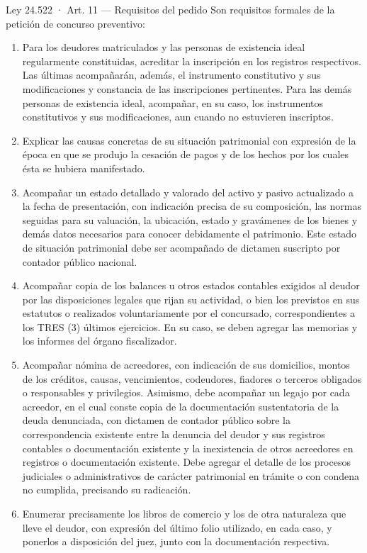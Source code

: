 \documentclass[12pt,oneside]{book}
\begin{document}
\begin{norma}{Ley 24.522 · Art. 11 — Requisitos del pedido}
Son requisitos formales de la petición de concurso preventivo:
\begin{enumerate}[label=\arabic*),leftmargin=*]
    \item Para los deudores matriculados y las personas de existencia ideal regularmente constituidas, acreditar la inscripción en los registros respectivos. Las últimas acompañarán, además, el instrumento constitutivo y sus modificaciones y constancia de las inscripciones pertinentes. Para las demás personas de existencia ideal, acompañar, en su caso, los instrumentos constitutivos y sus modificaciones, aun cuando no estuvieren inscriptos.
    \item Explicar las causas concretas de su situación patrimonial con expresión de la época en que se produjo la cesación de pagos y de los hechos por los cuales ésta se hubiera manifestado.
    \item Acompañar un estado detallado y valorado del activo y pasivo actualizado a la fecha de presentación, con indicación precisa de su composición, las normas seguidas para su valuación, la ubicación, estado y gravámenes de los bienes y demás datos necesarios para conocer debidamente el patrimonio. Este estado de situación patrimonial debe ser acompañado de dictamen suscripto por contador público nacional.
    \item Acompañar copia de los balances u otros estados contables exigidos al deudor por las disposiciones legales que rijan su actividad, o bien los previstos en sus estatutos o realizados voluntariamente por el concursado, correspondientes a los TRES (3) últimos ejercicios. En su caso, se deben agregar las memorias y los informes del órgano fiscalizador.
    \item Acompañar nómina de acreedores, con indicación de sus domicilios, montos de los créditos, causas, vencimientos, codeudores, fiadores o terceros obligados o responsables y privilegios. Asimismo, debe acompañar un legajo por cada acreedor, en el cual conste copia de la documentación sustentatoria de la deuda denunciada, con dictamen de contador público sobre la correspondencia existente entre la denuncia del deudor y sus registros contables o documentación existente y la inexistencia de otros acreedores en registros o documentación existente. Debe agregar el detalle de los procesos judiciales o administrativos de carácter patrimonial en trámite o con condena no cumplida, precisando su radicación.
    \item Enumerar precisamente los libros de comercio y los de otra naturaleza que lleve el deudor, con expresión del último folio utilizado, en cada caso, y ponerlos a disposición del juez, junto con la documentación respectiva.

\end{enumerate}
\end{norma}
\end{document}

